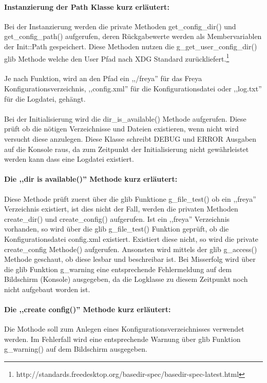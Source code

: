 \paragraph{Instanzierung der Path Klasse kurz erläutert:}
Bei der Instanzierung werden die private Methoden get\_config\_dir() und get\_config\_path() aufgerufen, deren Rückgabewerte werden
als Membervariablen der Init::Path gespeichert. Diese Methoden nutzen die g\_get\_user\_config\_dir() glib Methode
welche den User Pfad nach XDG Standard zurückliefert.\footnote{http://standards.freedesktop.org/basedir-spec/basedir-spec-latest.html}
\\
\\
Je nach Funktion, wird an den Pfad ein ,,/freya'' für das Freya Konfigurationsverzeichnis, ,,config.xml''
für die Konfigurationsdatei oder ,,log.txt'' für die Logdatei, gehängt.
\\
\\
Bei der Initialisierung wird die dir\_is\_available()
Methode aufgerufen. Diese prüft ob die nötigen Verzeichnisse und Dateien existieren, wenn nicht wird versucht diese
anzulegen. Diese Klasse schreibt DEBUG und ERROR Ausgaben auf die Konsole raus, da zum Zeitpunkt der Initialisierung
nicht gewährleistet werden kann dass eine Logdatei existiert.


\paragraph{Die ,,dir is available()'' Methode kurz erläutert:}
Diese Methode prüft zuerst über die glib Funktione g\_file\_test() ob ein ,,freya'' Verzeichnis existiert,
ist dies nicht der Fall, werden die privaten Methoden create\_dir() und create\_config() aufgerufen.
Ist ein ,,freya'' Verzeichnis vorhanden, so wird über die glib g\_file\_test() Funktion geprüft, ob die Konfigurationsdatei
config.xml existiert. Existiert diese nicht, so wird die private create\_config Methode() aufgerufen.
Ansonsten wird mittels der glib g\_access() Methode geschaut, ob diese lesbar und beschreibar ist. 
Bei Misserfolg wird über die glib Funktion g\_warning eine entsprechende Fehlermeldung auf
dem Bildschirm (Konsole) ausgegeben, da die Logklasse zu diesem Zeitpunkt noch nicht aufgebaut worden ist.


\paragraph{Die ,,create config()'' Methode kurz erläutert:}
Die Mothode soll zum Anlegen eines Konfigurationsverzeichnisses verwendet werden.
Im Fehlerfall wird eine entsprechende Warnung über glib Funktion g\_warning() auf dem Bildschirm ausgegeben.

